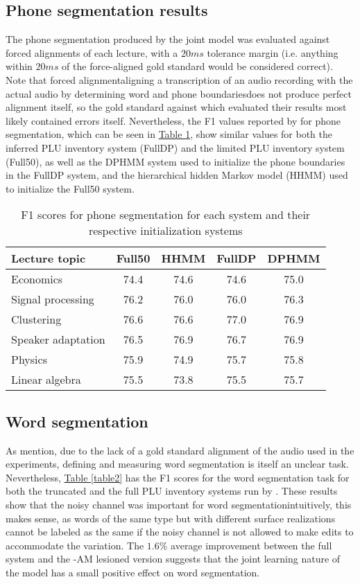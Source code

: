 \documentclass[12pt,letterpaper]{article}
\begin{document}
\subsection{Phone segmentation results}
The phone segmentation produced by the joint model was evaluated against forced alignments of each lecture, with a $20ms$ tolerance margin (i.e. anything within $20ms$ of the force-aligned gold standard would be considered correct). Note that forced alignment\textemdash aligning a transcription of an audio recording with the actual audio by determining word and phone boundaries\textemdash does not produce perfect alignment itself, so the gold standard against which \citet{lee:2015} evaluated their results most likely contained errors itself. Nevertheless, the F1 values reported by \citet{lee:2015} for phone segmentation, which can be seen in \hyperref[table1]{Table \ref*{table1}}, show similar values for both the inferred PLU inventory system (FullDP) and the limited PLU inventory system (Full50), as well as the DPHMM system used to initialize the phone boundaries in the FullDP system, and the hierarchical hidden Markov model (HHMM) used to initialize the Full50 system. 
\begin{table}
\begin{tabular}{|l|c|c||c|c|}
\hline
Lecture topic&Full50&HHMM&FullDP&DPHMM\\
\hline \hline
Economics&74.4&74.6&74.6&75.0\\
\hline
Signal processing&76.2&76.0&76.0&76.3\\
\hline
Clustering&76.6&76.6&77.0&76.9\\
\hline
Speaker adaptation&76.5&76.9&76.7&76.9\\
\hline
Physics&75.9&74.9&75.7&75.8\\
\hline
Linear algebra&75.5&73.8&75.5&75.7\\
\hline

\end{tabular}
\caption{F1 scores for phone segmentation for each system and their respective initialization systems \protect\citep{lee:2015}}
\label{table1}
\end{table}

\subsection{Word segmentation}
As \citet{lee:2015} mention, due to the lack of a gold standard alignment of the audio used in the experiments, defining and measuring word segmentation is itself an unclear task. Nevertheless, \hyperref[table2]{Table \ref*{table2}} has the F1 scores for the word segmentation task for both the truncated and the full PLU inventory systems run by \citet{lee:2015}. These results show that the noisy channel was important for word segmentation\textemdash intuitively, this makes sense, as words of the same type but with different surface realizations cannot be labeled as the same if the noisy channel is not allowed to make edits to accommodate the variation. The $1.6\%$ average improvement between the full system and the -AM lesioned version suggests that the joint learning nature of the model has a small positive effect on word segmentation.
\end{document}
